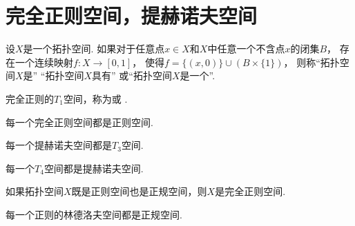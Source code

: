 \section{完全正则空间，提赫诺夫空间}
\begin{definition}
设\(X\)是一个拓扑空间.
如果对于任意点\(x \in X\)和\(X\)中任意一个不含点\(x\)的闭集\(B\)，
存在一个连续映射\(f\colon X \to [0,1]\)，
使得\(f = \{(x,0)\} \cup (B \times \{1\})\)，
则称“拓扑空间\(X\)是”
“拓扑空间\(X\)具有”
或“拓扑空间\(X\)是一个”.
\end{definition}

\begin{definition}
完全正则的\(T_1\)空间，称为或 .
\end{definition}

\begin{theorem}
每一个完全正则空间都是正则空间.
\end{theorem}

\begin{proposition}
每一个提赫诺夫空间都是\(T_3\)空间.
\end{proposition}

\begin{proposition}
每一个\(T_4\)空间都是提赫诺夫空间.
\end{proposition}

\begin{theorem}
如果拓扑空间\(X\)既是正则空间也是正规空间，则\(X\)是完全正则空间.
\end{theorem}

\begin{theorem}
每一个正则的林德洛夫空间都是正规空间.
\end{theorem}
